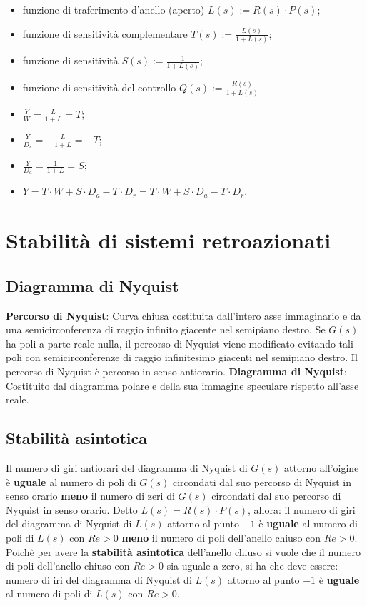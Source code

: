     \begin{itemize}
        \item funzione di traferimento d'anello (aperto) $L(s) := R(s) \cdot P(s)$;
        \item funzione di sensitività complementare $T(s) := \frac{L(s)}{1+ L(s)}$;
        \item funzione di sensitività $S(s) := \frac{1}{1+ L(s)}$;
        \item funzione di sensitività del controllo $Q(s) := \frac{R(s)}{1+L(s)}$
        \item $\frac{Y}{W} = \frac{L}{1+L} = T$;
        \item $\frac{Y}{D_r} = - \frac{L}{1+L} = -T$;
        \item $\frac{Y}{D_a} = \frac{1}{1+L} = S$;
        \item $Y = T \cdot W + S \cdot  D_a -T \cdot D_r = T \cdot W + S \cdot D_a - T \cdot D_r$.
    \end{itemize}
    \newpage\section{Stabilità di sistemi retroazionati}
    \subsection{Diagramma di Nyquist}
    \textbf{Percorso di Nyquist}: Curva chiusa costituita dall'intero asse immaginario e da una semicirconferenza di raggio infinito giacente nel semipiano destro. Se $G(s)$ ha poli a parte reale nulla, il percorso di Nyquist viene modificato evitando tali poli con semicirconferenze di raggio infinitesimo giacenti nel semipiano destro. Il percorso di Nyquist è percorso in senso antiorario.\newline
    \newline
    \textbf{Diagramma di Nyquist}: Costituito dal diagramma polare e della sua immagine speculare rispetto all'asse reale.
    \subsection{Stabilità asintotica}
    Il numero di giri antiorari del diagramma di Nyquist di $G(s)$ attorno all'oigine è \textbf{uguale} al numero di poli di $G(s)$ circondati dal suo percorso di Nyquist in senso orario \textbf{meno} il numero di zeri di $G(s)$ circondati dal suo percorso di Nyquist in senso orario.\newline
    \newline
    Detto $L(s) = R(s) \cdot P(s)$, allora:\newline
    il numero di giri del diagramma di Nyquist di $L(s)$ attorno al punto $-1$ è \textbf{uguale} al numero di poli di $L(s)$ con $Re> 0$ \textbf{meno} il numero di poli dell'anello chiuso con $Re > 0$.\newline
    \newline
    Poichè per avere la \textbf{stabilità asintotica} dell'anello chiuso si vuole che il numero di poli dell'anello chiuso con $Re > 0$ sia uguale a zero, si ha che deve essere:\newline
    numero di iri del diagramma di Nyquist di $L(s)$ attorno al punto $-1$ è \textbf{uguale} al numero di poli di $L(s)$ con $Re > 0$.
